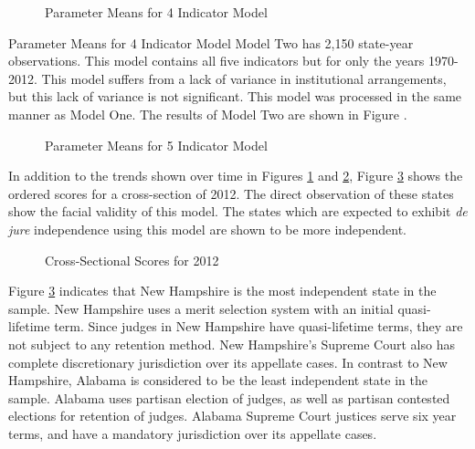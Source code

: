 \documentclass[12pt]{article}
\begin{document}
\begin{figure}[tbph]
\centering
\caption{Parameter Means for 4 Indicator Model}
\label{fig:AllState4Ind}
\end{figure}

  Parameter Means for 4 Indicator Model
Model Two has 2,150 state-year observations. This model contains all five indicators but for only the years 1970-2012.  This model suffers from a lack of variance in institutional arrangements, but this lack of variance is not significant.  This model was processed in the same manner as Model One.  The results of Model Two are shown in Figure .

\begin{figure}[tbph]
\centering
\caption{Parameter Means for 5 Indicator Model}
\label{fig:AllState5Ind}
\end{figure}

In addition to the trends shown over time in Figures \ref{fig:AllState4Ind} and \ref{fig:AllState5Ind}, Figure \ref{fig:TS5Ind} shows the ordered scores for a cross-section of 2012. The direct observation of these states show the facial validity of this model.  The states which are expected to exhibit \textit{de jure} independence using this model are shown to be more independent.  

\begin{figure}[tbh]
	\centering
	\caption{Cross-Sectional Scores for 2012}
	\label{fig:TS5Ind}
\end{figure}

Figure \ref{fig:TS5Ind} indicates that New Hampshire is the most independent state in the sample.  New Hampshire uses a merit selection system with an initial quasi-lifetime term.  Since judges in New Hampshire have quasi-lifetime terms, they are not subject to any retention method.  New Hampshire's Supreme Court also has complete discretionary jurisdiction over its appellate cases.  In contrast to New Hampshire, Alabama is considered to be the least independent state in the sample.  Alabama uses partisan election of judges, as well as partisan contested elections for retention of judges.  Alabama Supreme Court justices serve six year terms, and have a mandatory jurisdiction over its appellate cases.
\end{document}

